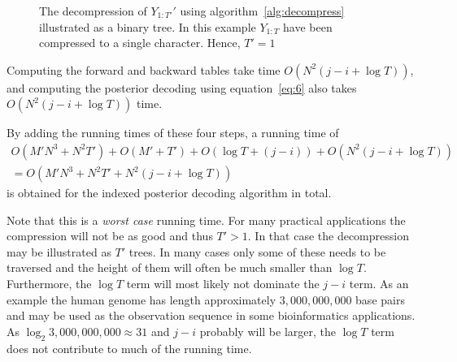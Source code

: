 \begin{enumerate}
  \begin{figure}
    \centering
    
    \caption{The decompression of $Y_{1:T'}'$ using
      algorithm~\ref{alg:decompress} illustrated as a binary tree. In this
      example $Y_{1:T}$ have been compressed to a single character. Hence,
      $T' = 1$}
    \label{fig:decompression}
  \end{figure}

  Computing the forward and backward tables take time
  $O(N^2 (j - i + \log T))$, and computing the posterior decoding using
  equation~\eqref{eq:6} also takes $O(N^2 (j - i + \log T))$ time.
\end{enumerate}
By adding the running times of these four steps, a running time of
\begin{gather*}
  O\left(M' N^3 + N^2 T'\right) + O\left(M' + T'\right) + O\left(\log T + (j - i)\right) + O\left(N^2 (j - i + \log T)\right) \\
  = O\left(M' N^3 + N^2 T' + N^2 (j - i + \log T)\right)
\end{gather*}
is obtained for the indexed posterior decoding algorithm in total.

Note that this is a \emph{worst case} running time. For many practical
applications the compression will not be as good and thus $T' > 1$. In that
case the decompression may be illustrated as $T'$ trees. In many cases only
some of these needs to be traversed and the height of them will often be much
smaller than $\log T$. Furthermore, the $\log T$ term will most likely not
dominate the $j - i$ term. As an example the human genome has length
approximately $3,000,000,000$ base pairs and may be used as the observation sequence
in some bioinformatics applications. As $\log_2 3,000,000,000 \approx 31$ and
$j - i$ probably will be larger, the $\log T$ term does not contribute to much
of the running time.

